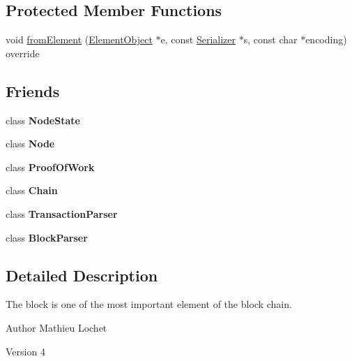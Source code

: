 \subsection*{Protected Member Functions}
\begin{DoxyCompactItemize}
\item 
void \mbox{\hyperlink{classBlock_ab21c6536cf7a26fdf2a2e889a84fcb9d}{from\+Element}} (\mbox{\hyperlink{classElementObject}{Element\+Object}} $\ast$e, const \mbox{\hyperlink{classSerializer}{Serializer}} $\ast$s, const char $\ast$encoding) override
\end{DoxyCompactItemize}
\subsection*{Friends}
\begin{DoxyCompactItemize}
\item 
\mbox{\label{classBlock_adfdd1242f00ef4da9a9a01d996fc292c}} 
class {\bfseries Node\+State}
\item 
\mbox{\label{classBlock_a6db9d28bd448a131448276ee03de1e6d}} 
class {\bfseries Node}
\item 
\mbox{\label{classBlock_a5493b64dfe8bc707452f326c6ec29f14}} 
class {\bfseries Proof\+Of\+Work}
\item 
\mbox{\label{classBlock_a65813570c30a3e0656fa523793ff1b86}} 
class {\bfseries Chain}
\item 
\mbox{\label{classBlock_a760b1478b5214c122458f0f19d45c127}} 
class {\bfseries Transaction\+Parser}
\item 
\mbox{\label{classBlock_a8428b3aeea6607d1ba12e603ff9d015c}} 
class {\bfseries Block\+Parser}
\end{DoxyCompactItemize}


\subsection{Detailed Description}
The block is one of the most important element of the block chain.

\begin{DoxyAuthor}{Author}
Mathieu Lochet 
\end{DoxyAuthor}
\begin{DoxyVersion}{Version}
4 
\end{DoxyVersion}


